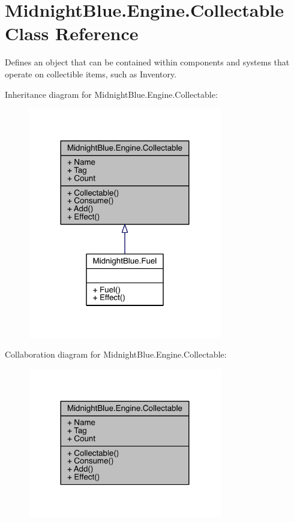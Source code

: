 \hypertarget{class_midnight_blue_1_1_engine_1_1_collectable}{}\section{Midnight\+Blue.\+Engine.\+Collectable Class Reference}
\label{class_midnight_blue_1_1_engine_1_1_collectable}


Defines an object that can be contained within components and systems that operate on collectible items, such as Inventory.  




Inheritance diagram for Midnight\+Blue.\+Engine.\+Collectable\+:
\nopagebreak
\begin{figure}[H]
\begin{center}
\leavevmode
\includegraphics[width=240pt]{class_midnight_blue_1_1_engine_1_1_collectable__inherit__graph}
\end{center}
\end{figure}


Collaboration diagram for Midnight\+Blue.\+Engine.\+Collectable\+:
\nopagebreak
\begin{figure}[H]
\begin{center}
\leavevmode
\includegraphics[width=240pt]{class_midnight_blue_1_1_engine_1_1_collectable__coll__graph}
\end{center}
\end{figure}
